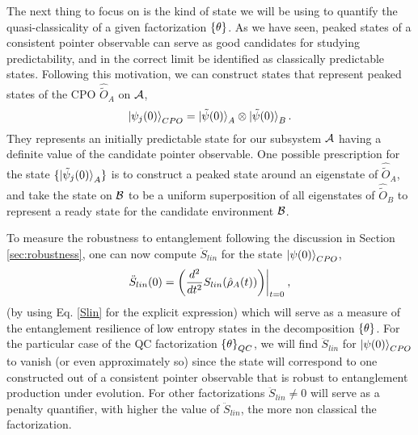 \documentclass[aps,pra,onecolumn,nofootinbib,11pt,tightenlines]{revtex4-1}
\begin{document}
The next thing to focus on is the kind of state we will be using to quantify the quasi-classicality of a given factorization ${\{\theta\}}$. As we have seen, peaked states of a consistent pointer observable can serve as good candidates for studying predictability, and in the correct limit be identified as classically predictable states.
Following this motivation, we can construct states that represent peaked states of the CPO $\hat{\tilde{O}}_{A}$ on $\mathcal{A}$, 
\begin{equation}
\ket{\psi_{j}(0)}_{CPO} = \ket{\tilde{\psi} (0)}_{A} \otimes \ket{\tilde{\psi} (0)}_{B}. 
\end{equation}
They represents an initially predictable state for our subsystem $\mathcal{A}$ having a definite value of the candidate pointer observable. One possible prescription for the state $\{\ket{\tilde{\psi}_{j} (0)}_{A}\}$ is to construct a peaked state around an eigenstate of $\hat{\tilde{O}}_{A}$, and take the state on $\mathcal{B}$ to be a uniform superposition of all eigenstates of $\hat{\tilde{O}}_{B}$ to represent a ready state for the candidate environment $\mathcal{B}$. 

{To measure the robustness to entanglement following the discussion in Section \ref{sec:robustness}, one can now compute $\ddot{S}_{lin}$ for the state $\ket{\psi(0)}_{CPO}$,
\begin{equation}
 \ddot{S}_{lin}(0)  =  \bigg(\frac{d^{2}}{dt^{2}}S_{lin}(\oprho_{A}(t)) \bigg)\bigg|_{t=0} \: ,
\end{equation}
(by using Eq. \ref{Slin} for the explicit expression) which will serve as a measure of the entanglement resilience of low entropy states in the decomposition ${\{\theta\}}$.} For the particular case of the QC factorization ${\{\theta\}}_{QC}$, we will find $\ddot{S}_{lin}$ for $\ket{\psi(0)}_{CPO}$ to  {vanish} (or even approximately so) since the state will correspond to one constructed out of a consistent pointer observable that is robust to entanglement production under evolution. For other factorizations $\ddot{S}_{lin} \neq 0$ will serve as a penalty quantifier, with higher the value of $\ddot{S}_{lin}$, the more non classical the factorization. 
\end{document}
